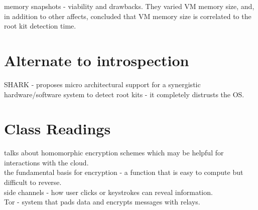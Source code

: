 \documentclass{article}
\begin{document}
\noindent\cite{toldinas:kaunas2009-VM-rootkits} memory snapshots - viability and drawbacks. They varied VM memory size, and, in addition to other affects, concluded that VM memory size is correlated to the root kit detection time.

\section{Alternate to introspection}

\noindent\cite{vasisht:micro2008-SHARK} SHARK - proposes micro architectural support for a synergistic hardware/software system to detect root kits - it completely distrusts the OS.\\

\section{Class Readings}

\noindent\cite{gentry:acm2010-homomorphic} talks about homomorphic encryption schemes which may be helpful for interactions with the cloud.\\

\noindent\cite{rivers:acm1978-onewayf} the fundamental basis for encryption - a function that is easy to compute but difficult to reverse.\\

\noindent\cite{chen:sp2010-side-channels} side channels - how user clicks or keystrokes can reveal information.\\

\noindent\cite{dingledine:ssym2004-tor} Tor - system that pads data and encrypts messages with relays.\\






\newpage
\onecolumn
\appendix
\end{document}
